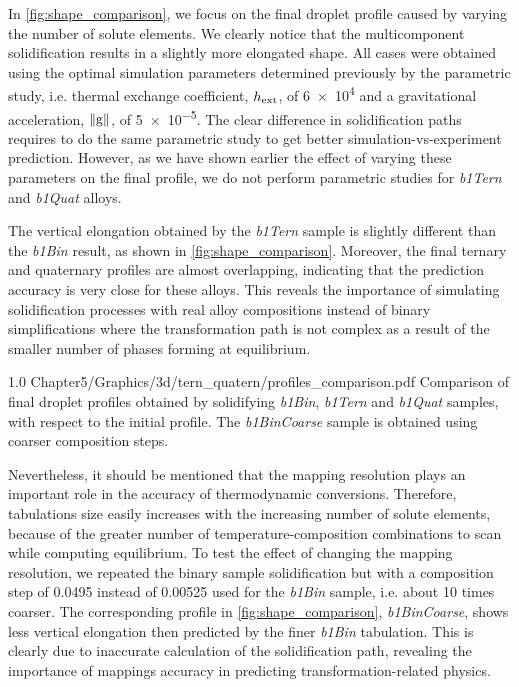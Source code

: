 In \cref{fig:shape_comparison}, we focus on the final droplet profile caused by varying the number of solute elements.
We clearly notice that the multicomponent solidification results in a slightly more elongated shape. 
All cases were obtained using the optimal simulation
parameters determined previously by the parametric study, i.e. thermal exchange coefficient, $h_{\text{ext}}$, of \SI{6e4}{\uhconvec} and a gravitational
acceleration, $\lVert \boldsymbol{\text{g}} \rVert$, of \SI{5e-5}{\uacceleration}. The clear difference in solidification paths requires to do the same 
parametric study to get better simulation-vs-experiment prediction. However, as we have shown earlier the effect of varying these parameters
on the final profile, we do not perform parametric studies for \emph{b1Tern} and \emph{b1Quat} alloys. 

The vertical elongation obtained by the \emph{b1Tern} sample is slightly different than the \emph{b1Bin} result, as shown in \cref{fig:shape_comparison}. 
Moreover, the final ternary and quaternary
profiles are almost overlapping, indicating that the prediction accuracy is very close for these alloys. 
This reveals the importance of simulating solidification processes with real alloy compositions instead of binary simplifications
where the transformation path is not complex as a result of the smaller number of phases forming at equilibrium. 

\begin{figureth}
{1.0}
{Chapter5/Graphics/3d/tern_quatern/profiles_comparison.pdf}
{Comparison of final droplet profiles obtained by solidifying \emph{b1Bin}, \emph{b1Tern} and \emph{b1Quat} samples, with respect to the initial profile. 
The \emph{b1BinCoarse} sample
is obtained using coarser composition steps.}
\label{fig:shape_comparison}
\end{figureth}

Nevertheless, it should be mentioned that the mapping resolution plays an important role in the accuracy of thermodynamic conversions.
Therefore, tabulations size easily increases with the increasing number of solute elements, because of the greater number of temperature-composition 
combinations to scan while computing equilibrium. To test the effect of changing the mapping resolution, we repeated the binary sample solidification
but with a composition step of \SI{0.0495}{\ucomposition} instead of \SI{0.00525}{\ucomposition} used for the \emph{b1Bin} sample, i.e. about 10 times coarser. 
The corresponding profile in \cref{fig:shape_comparison}, \emph{b1BinCoarse}, shows less vertical elongation then predicted by the finer \emph{b1Bin} tabulation. 
This is clearly due to inaccurate calculation of the solidification path, revealing the importance of mappings accuracy in predicting transformation-related physics.

